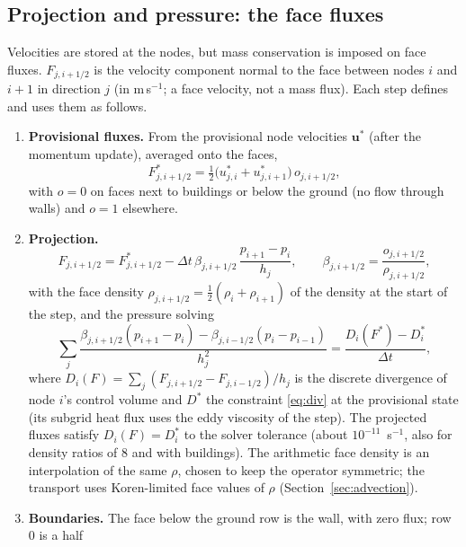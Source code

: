 \documentclass[11pt,a4paper]{article}
\newcommand{\vu}{\mathbf{u}}
\begin{document}
\subsection{Projection and pressure: the face fluxes}\label{sec:projection}
Velocities are stored at the nodes, but mass conservation is imposed on face fluxes. $F_{j,i+1/2}$ is the
velocity component normal to the face between nodes $i$ and $i+1$ in direction $j$ (in m\,s$^{-1}$; a face
velocity, not a mass flux). Each step defines and uses them as follows.
\begin{enumerate}
  \item \textbf{Provisional fluxes.} From the provisional node velocities $\vu^*$ (after the momentum
        update), averaged onto the faces,
        \begin{equation}
          F^*_{j,i+1/2}=\tfrac12\big(u^*_{j,i}+u^*_{j,i+1}\big)\,o_{j,i+1/2},
        \end{equation}
        with $o=0$ on faces next to buildings or below the ground (no flow through walls) and $o=1$
        elsewhere.
  \item \textbf{Projection.}
        \begin{equation}
          F_{j,i+1/2}=F^*_{j,i+1/2}-\Delta t\,\beta_{j,i+1/2}\,\frac{p_{i+1}-p_i}{h_j},\qquad
          \beta_{j,i+1/2}=\frac{o_{j,i+1/2}}{\rho_{j,i+1/2}},
        \end{equation}
        with the face density $\rho_{j,i+1/2}=\tfrac12(\rho_i+\rho_{i+1})$ of the density at the start of the
        step, and the pressure solving
        \begin{equation}
          \sum_j\frac{\beta_{j,i+1/2}(p_{i+1}-p_i)-\beta_{j,i-1/2}(p_i-p_{i-1})}{h_j^2}
          =\frac{D_i(F^*)-D^*_i}{\Delta t},
        \end{equation}
        where $D_i(F)=\sum_j(F_{j,i+1/2}-F_{j,i-1/2})/h_j$ is the discrete divergence of node $i$'s control
        volume and $D^*$ the constraint \eqref{eq:div} at the provisional state (its subgrid heat flux uses the
        eddy viscosity of the step). The projected fluxes satisfy $D_i(F)=D^*_i$ to the solver tolerance
        (about $10^{-11}$~s$^{-1}$, also for density ratios of 8 and with buildings). The arithmetic face density
        is an interpolation of the same $\rho$, chosen to keep the operator symmetric; the transport uses
        Koren-limited face values of $\rho$ (Section~\ref{sec:advection}).
  \item \textbf{Boundaries.} The face below the ground row is the wall, with zero flux; row 0 is a half

\end{enumerate}
\end{document}
